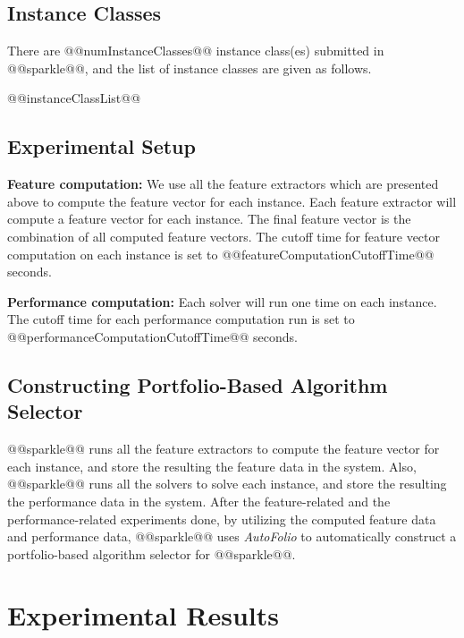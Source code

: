 \documentclass[british]{article}
\begin{document}
\subsection{Instance Classes}
\label{sec:Instance_Classes}
There are @@numInstanceClasses@@ instance class(es) submitted in @@sparkle@@, and the list of instance classes are given as follows.

\begin{enumerate}
@@instanceClassList@@
\end{enumerate}

\subsection{Experimental Setup}
\label{sec:Experimental_Setup}

\textbf{Feature computation:} We use all the feature extractors which are presented above to compute the feature vector for each instance. Each feature extractor will compute a feature vector for each instance. The final feature vector is the combination of all computed feature vectors. The cutoff time for feature vector computation on each instance is set to @@featureComputationCutoffTime@@ seconds.

\textbf{Performance computation:} Each solver will run one time on each instance. The cutoff time for each performance computation run is set to @@performanceComputationCutoffTime@@ seconds.

\subsection{Constructing Portfolio-Based Algorithm Selector}
\label{sec:Portfolio}

@@sparkle@@ runs all the feature extractors to compute the feature vector for each instance, and store the resulting the feature data in the system. Also, @@sparkle@@ runs all the solvers to solve each instance, and store the resulting the performance data in the system. After the feature-related and the performance-related experiments done, by utilizing the computed feature data and performance data, @@sparkle@@ uses \emph{AutoFolio} \cite{LinEtAl15} to automatically construct a portfolio-based algorithm selector for @@sparkle@@.

\section{Experimental Results}
\label{sec:Experimental_Results}
\end{document}
